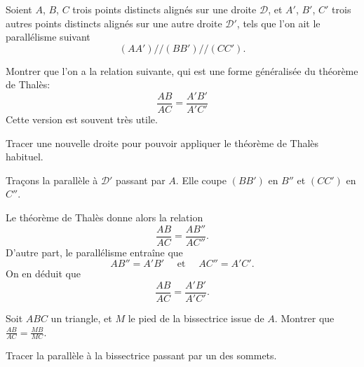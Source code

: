 \begin{exo}
Soient $A$, $B$, $C$ trois points distincts alignés sur une droite $\mathcal D$, et $A'$, $B'$, $C'$ trois autres points distincts alignés sur une autre droite $\mathcal D'$, tels que l'on ait le parallélisme suivant
\[ (AA')// (BB')//(CC').\]
\begin{center}
\end{center}
Montrer que l'on a la relation suivante, qui est une forme généralisée du théorème de Thalès:
\[ \frac{AB}{AC} = \frac{A'B'}{A'C'}\]
Cette version est souvent très utile.
\begin{hint}
Tracer une nouvelle droite pour pouvoir appliquer le théorème de Thalès habituel.
\end{hint}
\begin{sol}
Traçons la parallèle à $\mathcal D'$ passant par $A$. Elle coupe $(BB')$ en $B''$ et $(CC')$ en $C''$. 

\begin{center}
\begin{tikzpicture}
\end{tikzpicture}
\end{center}

Le théorème de Thalès donne alors la relation
\[ \frac{AB}{AC} = \frac{AB''}{AC''}.\]
D'autre part, le parallélisme entraîne que 
\[ AB'' = A'B' \quad \text{ et }\quad AC''=A'C'.\]
On en déduit que 
\[ \frac{AB}{AC} = \frac{A'B'}{A'C'}.\]

\end{sol}
\end{exo}

\begin{exo}

Soit $ABC$ un triangle, et $M$ le pied de la bissectrice issue de $A$. Montrer que $\frac{AB}{AC}=\frac{MB}{MC}$.
\begin{center}
\end{center}
\begin{hint}
Tracer la parallèle à la bissectrice passant par un des sommets.
\end{hint}
\begin{sol}
\end{sol}
\end{exo}

